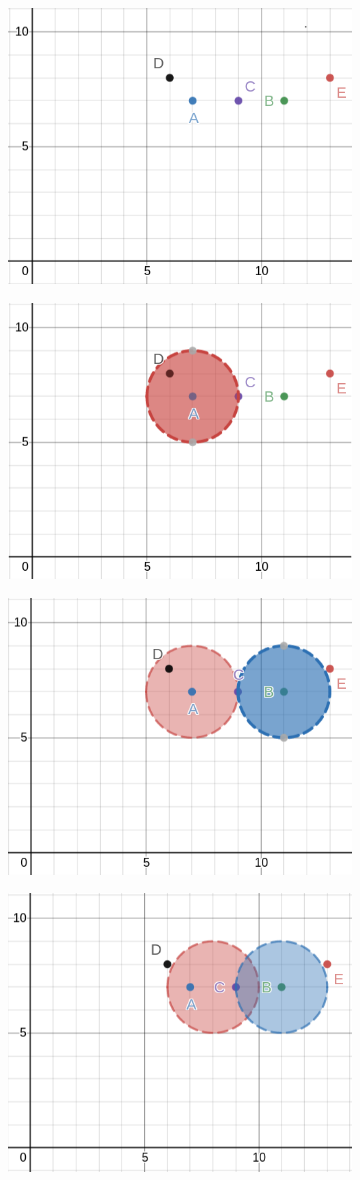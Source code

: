 \begin{figure} \centering
    \begin{subfigure}[]{}
        \includegraphics[width=.45\textwidth]{agrupamentos/agrupamentos_1.png}
        \label{fig:a}
    \end{subfigure}\hfill
    \begin{subfigure}[]{}
        \includegraphics[width=.45\textwidth]{agrupamentos/agrupamentos_2.png}
        \label{fig:b}    
    \end{subfigure}\hfill
    \newline
    
     \begin{subfigure}[]{}
        \includegraphics[width=.45\textwidth]{agrupamentos/agrupamentos_3.png}
        \label{fig:c}
    \end{subfigure}\hfill
    \begin{subfigure}[]{}
        \includegraphics[width=.45\textwidth]{agrupamentos/agrupamentos_4.png}
        \label{fig:d}    
    \end{subfigure}\hfill
    \newline
    

\end{figure}

